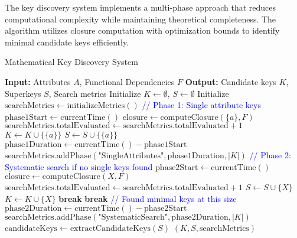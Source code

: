 \documentclass[acmsmall]{acmart}
\begin{document}
The key discovery system implements a multi-phase approach that reduces computational complexity while maintaining theoretical completeness. The algorithm utilizes closure computation with optimization bounds to identify minimal candidate keys efficiently.

\begin{algorithm}[h]
\caption{Mathematical Key Discovery System}
\label{alg:key_discovery}
\begin{algorithmic}[1]
\STATE \textbf{Input:} Attributes $A$, Functional Dependencies $F$
\STATE \textbf{Output:} Candidate keys $K$, Superkeys $S$, Search metrics
\STATE Initialize $K \leftarrow \emptyset$, $S \leftarrow \emptyset$
\STATE Initialize $\text{searchMetrics} \leftarrow \text{initializeMetrics}()$
\STATE \textcolor{blue}{// Phase 1: Single attribute keys}
\STATE $\text{phase1Start} \leftarrow \text{currentTime}()$
    \STATE $\text{closure} \leftarrow \text{computeClosure}(\{a\}, F)$
    \STATE $\text{searchMetrics.totalEvaluated} \leftarrow \text{searchMetrics.totalEvaluated} + 1$
        \STATE $K \leftarrow K \cup \{\{a\}\}$
        \STATE $S \leftarrow S \cup \{\{a\}\}$
    \ENDIF
\ENDFOR
\STATE $\text{phase1Duration} \leftarrow \text{currentTime}() - \text{phase1Start}$
\STATE $\text{searchMetrics.addPhase}(\text{"SingleAttributes"}, \text{phase1Duration}, |K|)$
\STATE \textcolor{blue}{// Phase 2: Systematic search if no single keys found}
    \STATE $\text{phase2Start} \leftarrow \text{currentTime}()$
            \STATE $\text{closure} \leftarrow \text{computeClosure}(X, F)$
            \STATE $\text{searchMetrics.totalEvaluated} \leftarrow \text{searchMetrics.totalEvaluated} + 1$
                \STATE $S \leftarrow S \cup \{X\}$
                    \STATE $K \leftarrow K \cup \{X\}$
                \ENDIF
            \ENDIF
                \STATE \textbf{break}
            \ENDIF
        \ENDFOR
            \STATE \textbf{break} \textcolor{blue}{// Found minimal keys at this size}
        \ENDIF
    \ENDFOR
    \STATE $\text{phase2Duration} \leftarrow \text{currentTime}() - \text{phase2Start}$
    \STATE $\text{searchMetrics.addPhase}(\text{"SystematicSearch"}, \text{phase2Duration}, |K|)$
\ENDIF
\STATE $\text{candidateKeys} \leftarrow \text{extractCandidateKeys}(S)$
\RETURN $(K, S, \text{searchMetrics})$
\end{algorithmic}
\end{algorithm}
\end{document}
